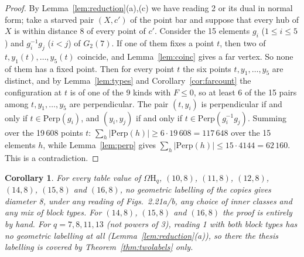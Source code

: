 \documentclass[11pt]{amsart}
\newtheorem{corollary}[theorem]{Corollary}
\theoremstyle{definition}
\theoremstyle{remark}
\numberwithin{equation}{section}
\newcommand{\Om}{\Omega\mathrm H}
\begin{document}
\begin{proof}
By Lemma~\ref{lem:reduction}(a),(c) we have reading 2 or its dual in normal form; take a starved pair $(X,c')$ of the point bar
and suppose that every hub of $X$ is within distance 8 of every point of $c'$. Consider the 15 elements $g_i$ ($1\le i\le5$)
and $g_i^{-1}g_j$ ($i<j$) of $G_2(7)$. If one of them fixes a point $t$, then two of $t,y_1(t),\dots,y_5(t)$ coincide, and
Lemma~\ref{lem:coinc} gives a far vertex. So none of them has a fixed point. Then for every point $t$ the six points
$t,y_1,\dots,y_5$ are distinct, and by Lemma~\ref{lem:types} and Corollary~\ref{cor:farcount} the configuration at $t$ is of
one of the 9 kinds with $F\le0$, so at least 6 of the 15 pairs among $t,y_1,\dots,y_5$ are perpendicular. The pair $(t,y_i)$ is
perpendicular if and only if $t\in\mathrm{Perp}(g_i)$, and $(y_i,y_j)$ if and only if $t\in\mathrm{Perp}(g_i^{-1}g_j)$.
Summing over the 19\,608 points $t$: $\sum_h|\mathrm{Perp}(h)|\ge6\cdot19\,608=117\,648$ over the 15 elements $h$, while
Lemma~\ref{lem:perp} gives $\sum_h|\mathrm{Perp}(h)|\le15\cdot4144=62\,160$. This is a contradiction.
\end{proof}

\begin{corollary}\label{cor:geomtable}
For every table value of $\Om_q$, $(10,8)$, $(11,8)$, $(12,8)$, $(14,8)$, $(15,8)$ and $(16,8)$, no geometric labelling of the
copies gives diameter 8, under any reading of Figs.~2.21a/b, any choice of inner classes and any mix of block types. For
$(14,8)$, $(15,8)$ and $(16,8)$ the proof is entirely by hand. For $q=7,8,11,13$ (not powers of 3), reading 1 with both block
types has no geometric labelling at all (Lemma~\ref{lem:reduction}(a)), so there the thesis labelling is covered by
Theorem~\ref{thm:twolabels} only.
\end{corollary}
\end{document}
